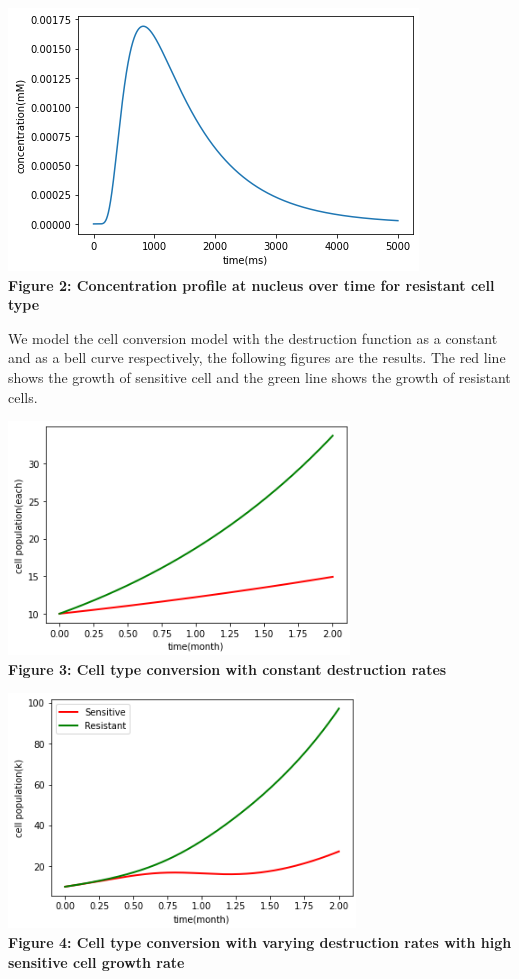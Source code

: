 \documentclass{edm_article}
\begin{document}
\includegraphics[scale = 0.6]{resistant.png}\\
\textbf{Figure 2: Concentration profile at nucleus over time for resistant cell type}

We model the cell conversion model with the destruction function as a constant and as a bell curve respectively, the following figures are the results. The red line shows the growth of sensitive cell and the green line shows the growth of resistant cells.

\includegraphics[scale = 0.6]{constant.png}\\
\textbf{Figure 3: Cell type conversion with constant destruction rates}

\includegraphics[scale = 0.6]{bell_2.png}\\
\textbf{Figure 4: Cell type conversion with varying destruction rates with high sensitive cell growth rate}
\end{document}
